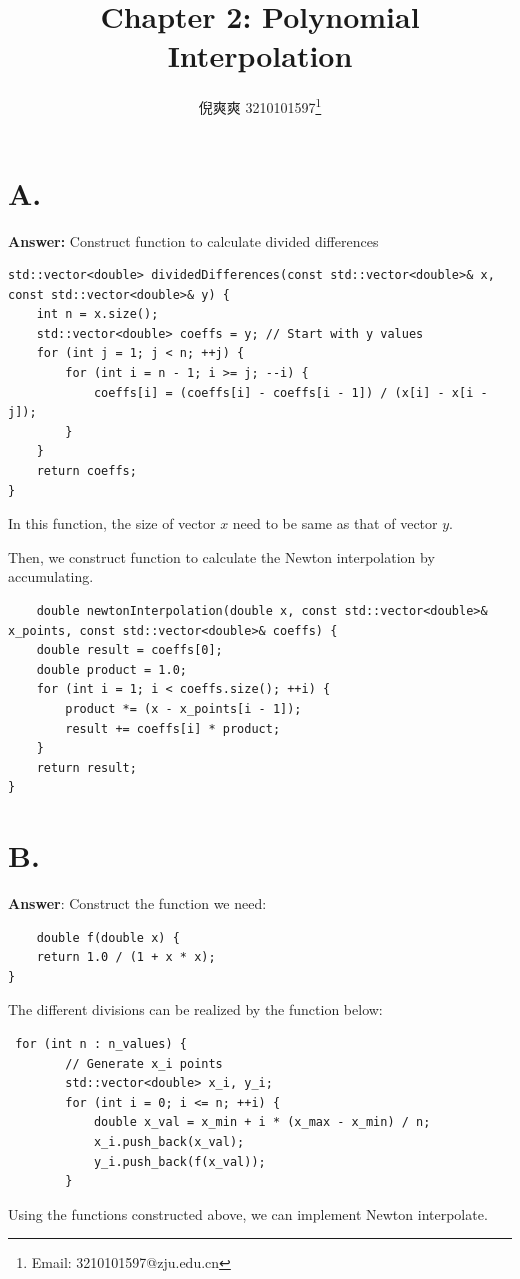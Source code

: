 \documentclass{article}
\title{Chapter 2: Polynomial Interpolation}
\author{倪爽爽 3210101597\thanks{Email: 3210101597@zju.edu.cn}}
\begin{document}
\begin{CJK}{UTF8}{gbsn}
\maketitle


\section*{A.}

\textbf{Answer: }
Construct function to calculate divided differences
\begin{verbatim}
std::vector<double> dividedDifferences(const std::vector<double>& x, const std::vector<double>& y) {
    int n = x.size();
    std::vector<double> coeffs = y; // Start with y values
    for (int j = 1; j < n; ++j) {
        for (int i = n - 1; i >= j; --i) {
            coeffs[i] = (coeffs[i] - coeffs[i - 1]) / (x[i] - x[i - j]);
        }
    }
    return coeffs;
}
\end{verbatim}
In this function, the size of vector $x$ need to be same as that of vector $y$.\par
Then, we construct function to calculate the Newton interpolation by accumulating.
\begin{verbatim}
    double newtonInterpolation(double x, const std::vector<double>& x_points, const std::vector<double>& coeffs) {
    double result = coeffs[0];
    double product = 1.0;
    for (int i = 1; i < coeffs.size(); ++i) {
        product *= (x - x_points[i - 1]);
        result += coeffs[i] * product;
    }
    return result;
}
\end{verbatim}



\section*{B.}


\textbf{Answer}: 
Construct the function we need:
\begin{verbatim}
    double f(double x) {
    return 1.0 / (1 + x * x);
}
\end{verbatim}
The different divisions can be realized by the function below:
\begin{verbatim}
 for (int n : n_values) {
        // Generate x_i points
        std::vector<double> x_i, y_i;
        for (int i = 0; i <= n; ++i) {
            double x_val = x_min + i * (x_max - x_min) / n;
            x_i.push_back(x_val);
            y_i.push_back(f(x_val));
        }
\end{verbatim}
Using the functions constructed above, we can implement Newton interpolate. 


\end{CJK}
\end{document}
